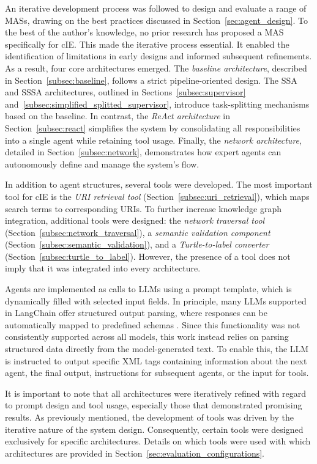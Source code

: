 \documentclass[a4paper,oneside,bibliography=totoc]{scrbook}
\begin{document}
An iterative development process was followed to design and evaluate a range of \acp{MAS}, drawing on the best practices discussed in Section~\ref{sec:agent_design}. To the best of the author's knowledge, no prior research has proposed a \ac{MAS} specifically for \ac{cIE}. This made the iterative process essential. It enabled the identification of limitations in early designs and informed subsequent refinements. As a result, four core architectures emerged. The \textit{baseline architecture}, described in Section~\ref{subsec:baseline}, follows a strict pipeline-oriented design. The \ac{SSA} and \ac{SSSA} architectures, outlined in Sections~\ref{subsec:supervisor} and~\ref{subsec:simplified_splitted_supervisor}, introduce task-splitting mechanisms based on the baseline. In contrast, the \textit{ReAct architecture} in Section~\ref{subsec:react} simplifies the system by consolidating all responsibilities into a single agent while retaining tool usage. Finally, the \textit{network architecture}, detailed in Section~\ref{subsec:network}, demonstrates how expert agents can autonomously define and manage the system's flow.

In addition to agent structures, several tools were developed. The most important tool for \ac{cIE} is the \textit{URI retrieval tool} (Section~\ref{subsec:uri_retrieval}), which maps search terms to corresponding URIs. To further increase knowledge graph integration, additional tools were designed: the \textit{network traversal tool} (Section~\ref{subsec:network_traversal}), a \textit{semantic validation component} (Section~\ref{subsec:semantic_validation}), and a \textit{Turtle-to-label converter} (Section~\ref{subsec:turtle_to_label}). However, the presence of a tool does not imply that it was integrated into every architecture.

Agents are implemented as calls to \acp{LLM} using a prompt template, which is dynamically filled with selected input fields. In principle, many \acp{LLM} supported in LangChain offer structured output parsing, where responses can be automatically mapped to predefined schemas \cite{LangChain2025e}. Since this functionality was not consistently supported across all models, this work instead relies on parsing structured data directly from the model-generated text. To enable this, the \ac{LLM} is instructed to output specific XML tags containing information about the next agent, the final output, instructions for subsequent agents, or the input for tools.

It is important to note that all architectures were iteratively refined with regard to prompt design and tool usage, especially those that demonstrated promising results. As previously mentioned, the development of tools was driven by the iterative nature of the system design. Consequently, certain tools were designed exclusively for specific architectures. Details on which tools were used with which architectures are provided in Section~\ref{sec:evaluation_configurations}.
\end{document}
